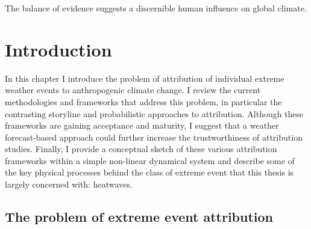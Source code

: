 {\onehalfspacing%
\begin{savequote}[8cm]
  The balance of evidence suggests a discernible human influence on global climate.
\end{savequote}
    
\chapter{\label{intro}Introduction} 

In this chapter I introduce the problem of attribution of individual extreme weather events to anthropogenic climate change. I review the current methodologies and frameworks that address this problem, in particular the contrasting storyline and probabilistic approaches to attribution. Although these frameworks are gaining acceptance and maturity, I suggest that a weather forecast-based approach could further increase the trustworthiness of attribution studies. Finally, I provide a conceptual sketch of these various attribution frameworks within a simple non-linear dynamical system and describe some of the key physical processes behind the class of extreme event that this thesis is largely concerned with: heatwaves.

\clearpage

\minitoc

\clearpage}

\section{The problem of extreme event attribution}\label{intro:problem}

